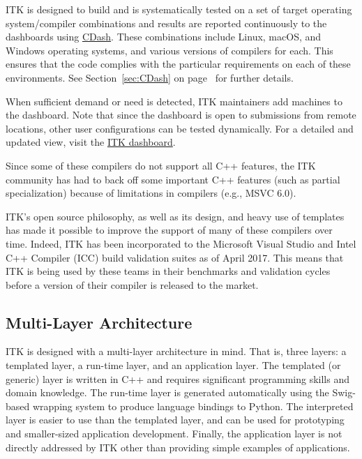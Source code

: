ITK is designed to build and is systematically tested on a set of target
operating system/compiler combinations and results are reported continuously
to the dashboards using \href{https://www.cdash.org/}{CDash}. These combinations
include Linux, macOS, and Windows operating systems, and various versions of
compilers for each. This ensures that the code complies with the particular
requirements on each of these environments. See Section~\ref{sec:CDash}
on page~\pageref{sec:CDash} for further details.

When sufficient demand or need is detected, ITK maintainers add machines to the
dashboard. Note that since the dashboard is open to submissions from remote
locations, other user configurations can be tested dynamically. For a detailed
and updated view, visit the
\href{https://open.cdash.org/index.php?project=Insight}{ITK dashboard}.

Since some of these compilers do not support all C++ features, the ITK community
has had to back off some important C++ features (such as partial specialization)
because of limitations in compilers (e.g., MSVC 6.0).

ITK's open source philosophy, as well as its design, and heavy use of templates
has made it possible to improve the support of many of these compilers over
time. Indeed, ITK has been incorporated to the Microsoft Visual Studio and Intel
C++ Compiler (ICC) build validation suites as of April 2017. This means that
ITK is being used by these teams in their benchmarks and validation cycles
before a version of their compiler is released to the market.


\subsection{Multi-Layer Architecture}%
\label{subsec:MultiLayerArchitecture}

ITK is designed with a multi-layer architecture in mind. That is, three layers:
a templated layer, a run-time layer, and an application layer. The templated (or
generic) layer is written in C++ and requires significant programming skills and
domain knowledge. The run-time layer is generated automatically using the
Swig-based wrapping system to produce language bindings to Python. The
interpreted layer is easier to use than the templated layer, and can be used for
prototyping and smaller-sized application development. Finally, the application
layer is not directly addressed by ITK other than providing simple examples of
applications.

